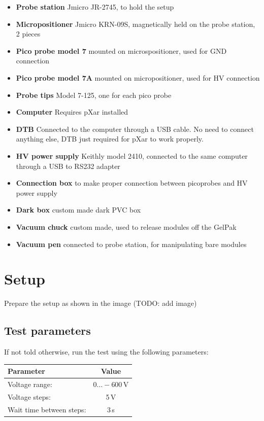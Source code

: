 \documentclass[10pt]{unlsilabsop}
\begin{document}
\begin{itemize}
\item \textbf{Probe station} Jmicro JR-2745, to hold the setup
\item \textbf{Micropositioner} Jmicro KRN-09S, magnetically held on the probe station, 2 pieces
\item \textbf{Pico probe model 7} mounted on microspositioner, used for GND connection
\item \textbf{Pico probe model 7A} mounted on micropositioner, used for HV connection
\item \textbf{Probe tips} Model 7-125, one for each pico probe
\item \textbf{Computer} Requires pXar installed
\item \textbf{DTB} Connected to the computer through a USB cable. No need to connect anything else, DTB just required for pXar to work properly.
\item \textbf{HV power supply} Keithly model 2410, connected to the same computer through a USB to RS232 adapter
\item \textbf{Connection box} to make proper connection between picoprobes and HV power supply
\item \textbf{Dark box} custom made dark PVC box
\item \textbf{Vacuum chuck} custom made, used to release modules off the GelPak
\item \textbf{Vacuum pen} connected to probe station, for manipulating bare modules
\end{itemize}

\section{Setup}

Prepare the setup as shown in the image (TODO: add image)

\subsection{Test parameters}

If not told otherwise, run the test using the following parameters:

\bigskip

\begin{tabular}{lc}
\toprule
Parameter & Value \\
\midrule
Voltage range: & $0\dots-600$\,V \\
Voltage steps: & 5\,V \\
Wait time between steps: & 3\,s \\
\bottomrule
\end{tabular}
\end{document}

